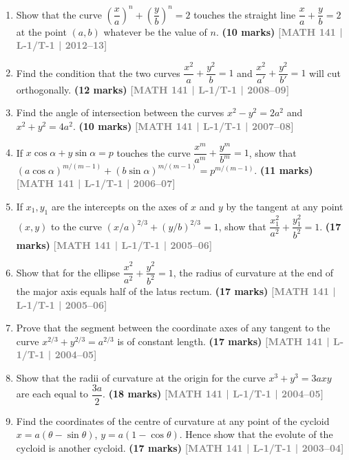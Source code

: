 \documentclass[12pt,a3paper]{article}
\newcommand{\yr}[1]{\hfill\textcolor{gray}{\small\textbf{[#1]}}}
\newcommand{\mk}[1]{\textcolor{orange!70!black}{\small\textbf{(#1 marks)}}}
\begin{document}
\begin{enumerate}
\item Show that the curve $\left(\dfrac{x}{a}\right)^{n}+\left(\dfrac{y}{b}\right)^{n}=2$ touches the straight line $\dfrac{x}{a}+\dfrac{y}{b}=2$ at the point $(a,b)$ whatever be the value of $n$.
\mk{10} \yr{MATH 141 | L-1/T-1 | 2012--13}

\item Find the condition that the two curves $\dfrac{x^{2}}{a}+\dfrac{y^{2}}{b}=1$ and $\dfrac{x^{2}}{a'}+\dfrac{y^{2}}{b'}=1$ will cut orthogonally.
\mk{12} \yr{MATH 141 | L-1/T-1 | 2008--09}

\item Find the angle of intersection between the curves $x^{2}-y^{2}=2a^{2}$ and $x^{2}+y^{2}=4a^{2}$.
\mk{10} \yr{MATH 141 | L-1/T-1 | 2007--08}

\item If $x\cos\alpha+y\sin\alpha=p$ touches the curve $\dfrac{x^{m}}{a^{m}}+\dfrac{y^{m}}{b^{m}}=1$, show that $(a\cos\alpha)^{m/(m-1)}+(b\sin\alpha)^{m/(m-1)}=p^{m/(m-1)}$.
\mk{11} \yr{MATH 141 | L-1/T-1 | 2006--07}

\item If $x_{1},y_{1}$ are the intercepts on the axes of $x$ and $y$ by the tangent at any point $(x,y)$ to the curve $(x/a)^{2/3}+(y/b)^{2/3}=1$, show that $\dfrac{x_{1}^{2}}{a^{2}}+\dfrac{y_{1}^{2}}{b^{2}}=1$.
\mk{17} \yr{MATH 141 | L-1/T-1 | 2005--06}

\item Show that for the ellipse $\dfrac{x^{2}}{a^{2}}+\dfrac{y^{2}}{b^{2}}=1$, the radius of curvature at the end of the major axis equals half of the latus rectum.
\mk{17} \yr{MATH 141 | L-1/T-1 | 2005--06}

\item Prove that the segment between the coordinate axes of any tangent to the curve $x^{2/3}+y^{2/3}=a^{2/3}$ is of constant length.
\mk{17} \yr{MATH 141 | L-1/T-1 | 2004--05}

\item Show that the radii of curvature at the origin for the curve $x^{3}+y^{3}=3axy$ are each equal to $\dfrac{3a}{2}$.
\mk{18} \yr{MATH 141 | L-1/T-1 | 2004--05}

\item Find the coordinates of the centre of curvature at any point of the cycloid $x=a(\theta-\sin\theta)$, $y=a(1-\cos\theta)$. Hence show that the evolute of the cycloid is another cycloid.
\mk{17} \yr{MATH 141 | L-1/T-1 | 2003--04}


\end{enumerate}
\end{document}
